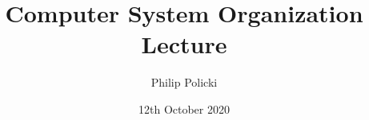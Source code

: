 \documentclass{article}
\title{Computer System Organization \\ Lecture }
\author{Philip Policki}
\date{12th October 2020}
\begin{document}
	
\section{}

\maketitle
\end{document}
